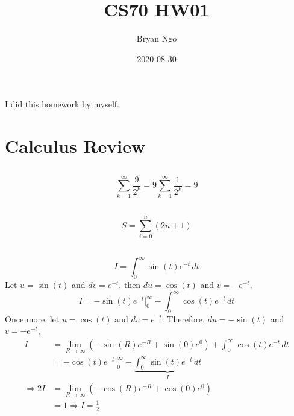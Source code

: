 \documentclass{article}
\title{CS70 HW01}
\author{Bryan Ngo}
\date{2020-08-30}
\begin{document}
\maketitle

I did this homework by myself.

\section{Calculus Review}

\subsection{}

\begin{equation}
    \sum_{k = 1}^\infty \frac{9}{2^k} = 9 \sum_{k = 1}^\infty \frac{1}{2^k} = 9
\end{equation}

\subsection{}

\begin{equation}
    S = \sum_{i = 0}^n (2n + 1)
\end{equation}

\subsection{}

\begin{equation}
    I = \int_0^{\infty} \sin(t) e^{-t} \, dt
\end{equation}
Let \(u = \sin(t)\) and \(dv = e^{-t}\), then \(du = \cos(t)\) and \(v = -e^{-t}\),
\begin{equation}
    I = -\sin(t) e^{-t}|_0^\infty + \int_0^\infty \cos(t) e^{-t} \, dt
\end{equation}
Once more, let \(u = \cos(t)\) and \(dv = e^{-t}\).
Therefore, \(du = -\sin(t)\) and \(v = -e^{-t}\),
\begin{align}
    I &= \lim_{R \to \infty} (-\sin(R) e^{-R} + \sin(0) e^{0}) + \int_0^\infty \cos(t) e^{-t} \, dt \\
    &= -\cos(t) e^{-t}|_0^\infty - \underbrace{\int_0^\infty \sin(t) e^{-t} \, dt}_I \\
    \Rightarrow 2I &= \lim_{R \to \infty} (-\cos(R) e^{-R} + \cos(0) e^0) \\
    &= 1 \Rightarrow I = \frac{1}{2}
\end{align}
\end{document}

